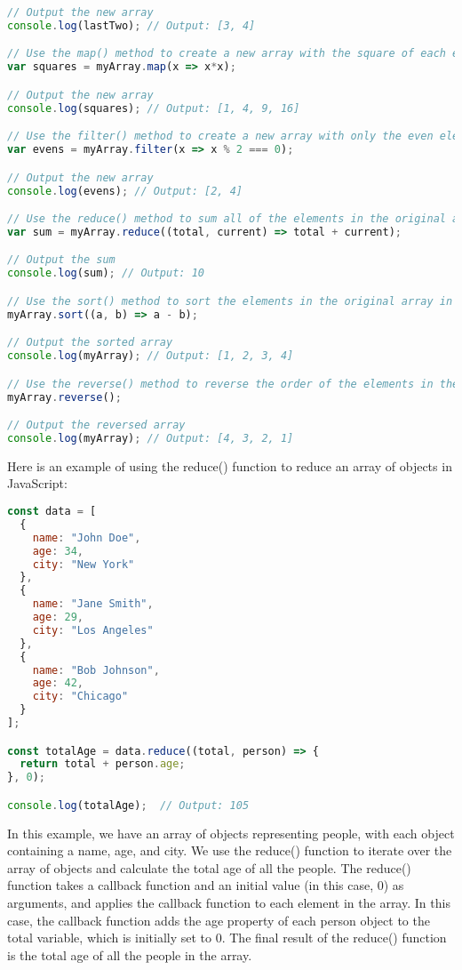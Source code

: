 {\begin{lstlisting}[language=Javascript, caption=Javascript array example]
// Output the new array
console.log(lastTwo); // Output: [3, 4]

// Use the map() method to create a new array with the square of each element in the original array
var squares = myArray.map(x => x*x);

// Output the new array
console.log(squares); // Output: [1, 4, 9, 16]

// Use the filter() method to create a new array with only the even elements in the original array
var evens = myArray.filter(x => x % 2 === 0);

// Output the new array
console.log(evens); // Output: [2, 4]

// Use the reduce() method to sum all of the elements in the original array
var sum = myArray.reduce((total, current) => total + current);

// Output the sum
console.log(sum); // Output: 10

// Use the sort() method to sort the elements in the original array in ascending order
myArray.sort((a, b) => a - b);

// Output the sorted array
console.log(myArray); // Output: [1, 2, 3, 4]

// Use the reverse() method to reverse the order of the elements in the original array
myArray.reverse();

// Output the reversed array
console.log(myArray); // Output: [4, 3, 2, 1]
\end{lstlisting}

Here is an example of using the reduce() function to reduce an array of objects in JavaScript:

\begin{lstlisting}[language=Javascript, caption=Example of reducing an array in javascript]
const data = [
  {
    name: "John Doe",
    age: 34,
    city: "New York"
  },
  {
    name: "Jane Smith",
    age: 29,
    city: "Los Angeles"
  },
  {
    name: "Bob Johnson",
    age: 42,
    city: "Chicago"
  }
];

const totalAge = data.reduce((total, person) => {
  return total + person.age;
}, 0);

console.log(totalAge);  // Output: 105

\end{lstlisting}
In this example, we have an array of objects representing people, with each object containing a name, age, and city. We use the reduce() function to iterate over the array of objects and calculate the total age of all the people. The reduce() function takes a callback function and an initial value (in this case, 0) as arguments, and applies the callback function to each element in the array. In this case, the callback function adds the age property of each person object to the total variable, which is initially set to 0. The final result of the reduce() function is the total age of all the people in the array.

}
